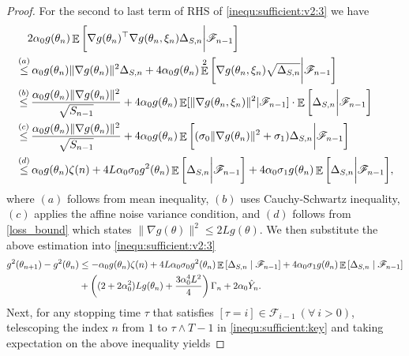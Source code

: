 \documentclass[standalone]{article}
\DeclareMathOperator{\Expect}{\mathbb{E}}
\begin{document}
\begin{proof}
For the second to last term of RHS of \cref{inequ:sufficient:v2:3} we have
\begin{equation}\nonumber\begin{aligned}
&\quad 2\alpha_{0}g(\theta_{n})\Expect\bigg[\nabla g(\theta_{n})^{\top}\nabla g(\theta_{n},\xi_{n})\Delta_{S,n}\bigg|\mathscr{F}_{n-1}\bigg]\\& \mathop{\le}^{(a)} \alpha_{0}g(\theta_{n})\|\nabla g(\theta_{n})\|^{2} \Delta_{S,n}+4\alpha_{0}g(\theta_{n})\Expect^{2}\bigg[\nabla g(\theta_{n},\xi_{n})\sqrt{\Delta_{S,n}}\bigg|\mathscr{F}_{n-1}\bigg] \notag \\
& \mathop{\le}^{(b)}\frac{\alpha_{0}g(\theta_{n})\|\nabla g(\theta_{n})\|^{2}}{\sqrt{S_{n-1}}}+4\alpha_{0}g(\theta_{n})\Expect[\|\nabla g(\theta_{n},\xi_{n})\|^{2}|\mathscr{F}_{n-1}]\cdot\Expect\bigg[\Delta_{S,n}\bigg|\mathscr{F}_{n-1}\bigg]\\&\mathop{\le}^{(c)} \frac{\alpha_{0}g(\theta_{n})\|\nabla g(\theta_{n})\|^{2}}{\sqrt{S_{n-1}}}+4\alpha_{0}g(\theta_{n})\Expect\bigg[(\sigma_{0}\|\nabla g(\theta_{n})\|^{2}+\sigma_{1})\Delta_{S,n}\bigg|\mathscr{F}_{n-1}\bigg]\\&\mathop{\le}^{(d)} \alpha_{0}g(\theta_{n})\zeta(n)+4 L\alpha_{0}\sigma_{0}g^{2}(\theta_{n})\Expect\bigg[ \Delta_{S,n}\bigg|\mathscr{F}_{n-1}\bigg]+4\alpha_{0}\sigma_{1}g(\theta_{n})\Expect\bigg[\Delta_{S,n}\bigg|\mathscr{F}_{n-1}\bigg],
\end{aligned}\end{equation} 
where $(a)$ follows from mean inequality, $(b)$ uses Cauchy-Schwartz inequality, $(c)$ applies the affine noise variance condition, and $(d)$ follows from \cref{loss_bound} which states $\|\nabla g(\theta)\|^2 \leq 2 Lg(\theta)$. We then substitute the above estimation into \cref{inequ:sufficient:v2:3}
\begin{align}\label{inequ:sufficient:key}
{g^{2}(\theta_{n+1})}-{g^{2}(\theta_{n})} 
& \le- \alpha_0 g(\theta_{n}) \zeta(n)+4 L\alpha_{0}\sigma_{0}g^{2}(\theta_{n})\Expect\left[\Delta_{S,n}\mid\mathscr{F}_{n-1}\right]+4\alpha_{0}\sigma_{1}g(\theta_{n})\Expect\left[\Delta_{S,n}\mid\mathscr{F}_{n-1}\right] \notag \\& +\left((2+2\alpha_0^2) Lg(\theta_n) + \frac{3\alpha_0^4 L^2}{4} \right)\Gamma_n +2\alpha_0 \hat{Y}_n.
\end{align}
Next, for any stopping time $\tau$ that satisfies $[\tau=i] \in \mathscr{F}_{i-1}\ (\forall\ i>0)$, telescoping the index $n$ from $1$ to $\tau\wedge T-1$ in \cref{inequ:sufficient:key} and taking expectation on the above inequality yields

\end{proof}
\end{document}
